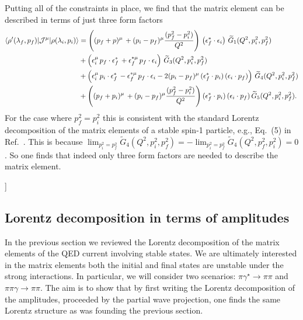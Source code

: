 Putting all of the constraints in place, we find that the matrix element can be described in terms of just three form factors
\begin{align}
\langle\rho'(\lambda_f,p_f)|{\mathcal{J}}^{\mu}|\rho(\lambda_i,p_i)\rangle
&=
\left((p_f+p)^\mu \,+(p_i-p_f)^\mu\frac{(p_f^2-p_i^2)}{Q^2} \right)\,\left(\epsilon_f^*\cdot \epsilon_i\right)\, \widetilde{G}_1(Q^2,p_i^2,p_f^2)\,
\nonumber\\&
+\left(\epsilon_i^\mu\, p_f\cdot \epsilon_f^*\,
+\epsilon_f^{*\mu}\, p_f\cdot \epsilon_i\right)\,\widetilde{G}_3(Q^2,p_i^2,p_f^2)\,
\nonumber\\
&+\left(\epsilon_i^\mu\, p_i\cdot \epsilon_f^*\,-\epsilon_f^{*\mu}\, p_f\cdot \epsilon_i
-2
(p_i-p_f)^\mu \,(\epsilon_f^*\cdot p_i)\,(\epsilon_i\cdot p_f)
\right)
\,\widetilde{G}_4(Q^2,p_i^2,p_f^2)
\nonumber\\&
+\left((p_f+p_i)^\mu \,+(p_i-p_f)^\mu\frac{(p_f^2-p_i^2)}{Q^2} \right)(\epsilon_f^*\cdot p_i)\,(\epsilon_i\cdot p_f)\,\widetilde{G}_5(Q^2,p_i^2,p_f^2).
\label{eq:rho_to_rho_FF}
\end{align}
 For the case where $p_f^2=p_i^2$ this is consistent with the standard Lorentz decomposition of the matrix elements of a stable spin-1 particle, e.g., Eq.~(5) in Ref.~\cite{Shultz:2015pfa}. This is because $\lim_{p_i^2=p_f^2}\widetilde{G}_4(Q^2,p_i^2,p_f^2)=-\lim_{p_i^2=p_f^2}\widetilde{G}_4(Q^2,p_f^2,p_i^2)=0$. So one finds that indeed only three form factors are needed to describe the matrix element. 

{ }

{\raul [compare with the equation appearing in page 18 of arXiv:0902.2241v1 [hep-ph]]}

 \subsection{Lorentz decomposition in terms of amplitudes \label{sec:Lorentz_amps}}
In the previous section we reviewed the Lorentz decomposition of the matrix elements of the QED current involving stable states. We are ultimately interested in the matrix elements both the initial and final states are unstable under the strong interactions. In particular, we will consider two scenarios: $\pi\gamma^\star\to\pi\pi$ and $\pi\pi\gamma\to\pi\pi$. The aim is to show that by first writing the Lorentz decomposition of the amplitudes, proceeded by the partial wave projection, one finds the same Lorentz structure as was founding the previous section. 

